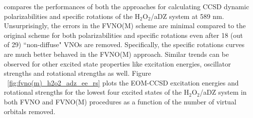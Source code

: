 compares the performances of both the approaches for calculating CCSD dynamic polarizabilities and specific rotations 
of the H$_2$O$_2$/aDZ system at 589 nm. Unsurprisingly, the errors in the FVNO(M) scheme are minimal compared to the original scheme for 
both polarizabilities and specific rotations even after 18 (out of 29) ``non-diffuse" VNOs are removed.
Specifically, the specific rotations curves are much better behaved in the 
FVNO(M) approach. Similar trends can be observed for other excited state
properties like excitation energies, oscillator strengths and rotational 
strengths as well. Figure ~\ref{fig:fvno(m)_h2o2_adz_ee_rs} plots the EOM-CCSD 
excitation energies and rotational strengths for the lowest four excited states of the H$_2$O$_2$/aDZ system
in both FVNO and FVNO(M) procedures as a function of the number of virtual orbitals removed.
